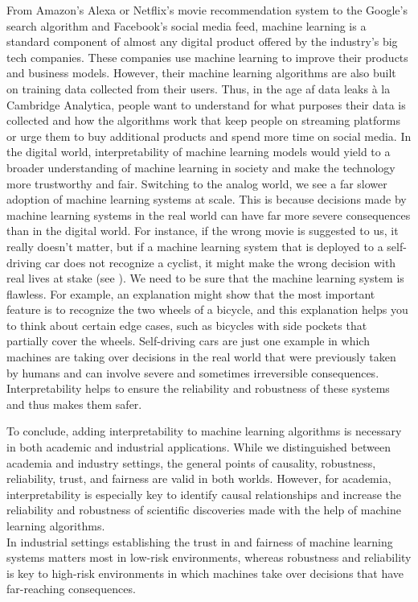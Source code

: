 \documentclass[]{krantz}
\begin{document}
From Amazon's Alexa or Netflix's movie recommendation system to the
Google's search algorithm and Facebook's social media feed, machine
learning is a standard component of almost any digital product offered
by the industry's big tech companies. These companies use machine
learning to improve their products and business models. However, their
machine learning algorithms are also built on training data collected
from their users. Thus, in the age af data leaks à la Cambridge
Analytica, people want to understand for what purposes their data is
collected and how the algorithms work that keep people on streaming
platforms or urge them to buy additional products and spend more time on
social media. In the digital world, interpretability of machine learning
models would yield to a broader understanding of machine learning in
society and make the technology more trustworthy and fair. Switching to
the analog world, we see a far slower adoption of machine learning
systems at scale. This is because decisions made by machine learning
systems in the real world can have far more severe consequences than in
the digital world. For instance, if the wrong movie is suggested to us,
it really doesn't matter, but if a machine learning system that is
deployed to a self-driving car does not recognize a cyclist, it might
make the wrong decision with real lives at stake (see
\citet{molnar2019}). We need to be sure that the machine learning system
is flawless. For example, an explanation might show that the most
important feature is to recognize the two wheels of a bicycle, and this
explanation helps you to think about certain edge cases, such as
bicycles with side pockets that partially cover the wheels. Self-driving
cars are just one example in which machines are taking over decisions in
the real world that were previously taken by humans and can involve
severe and sometimes irreversible consequences. Interpretability helps
to ensure the reliability and robustness of these systems and thus makes
them safer.

To conclude, adding interpretability to machine learning algorithms is
necessary in both academic and industrial applications. While we
distinguished between academia and industry settings, the general points
of causality, robustness, reliability, trust, and fairness are valid in
both worlds. However, for academia, interpretability is especially key
to identify causal relationships and increase the reliability and
robustness of scientific discoveries made with the help of machine
learning algorithms.\\
In industrial settings establishing the trust in and fairness of machine
learning systems matters most in low-risk environments, whereas
robustness and reliability is key to high-risk environments in which
machines take over decisions that have far-reaching consequences.
\end{document}

